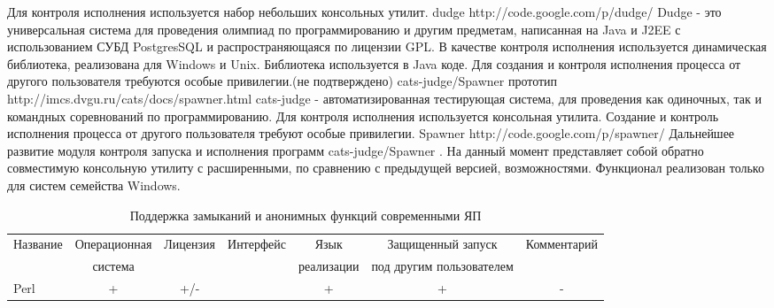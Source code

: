 \documentclass{imcs}
\begin{document}
Для контроля исполнения используется набор небольших консольных утилит.
dudge http://code.google.com/p/dudge/
Dudge - это универсальная система для проведения олимпиад по программированию и другим предметам, написанная на Java и J2EE с использованием СУБД PostgresSQL и распространяющаяся по лицензии GPL. 
В качестве контроля исполнения используется динамическая библиотека, реализована для Windows и Unix. Библиотека используется в Java коде. Для создания и контроля исполнения процесса от другого пользователя требуются особые привилегии.(не подтверждено)
cats-judge/Spawner прототип http://imcs.dvgu.ru/cats/docs/spawner.html
cats-judge - автоматизированная тестирующая система, для проведения как одиночных, так и командных соревнований по программированию.
Для контроля исполнения используется консольная утилита. Создание и контроль исполнения процесса от другого пользователя требуют особые привилегии.
Spawner http://code.google.com/p/spawner/
Дальнейшее развитие модуля контроля запуска и исполнения программ cats-judge/Spawner .
На данный момент представляет собой обратно совместимую консольную утилиту с расширенными, по сравнению с предыдущей версией, возможностями.
Функционал реализован только для систем семейства Windows.


\begin{table}[h!]
\begin{center}
\begin{tabular}{|l|c|c|c|c|c|c|}
\hline
  Название   &  Операционная  &  Лицензия  &  Интерфейс  &  Язык	 		&  Защищенный запуск 	  & Комментарий \\
         	&  система    	 &      		  &  	   		&  реализации   	& под другим пользователем &	           \\
\hline
 Perl    &  +          &  +/-        &             &  +          &  +   &   -    \\
\hline
\end{tabular}
\caption{Поддержка замыканий и анонимных функций современными ЯП}\label{tab:wsi_diff_rel}
\end{center}
\end{table}
 
\end{document}
